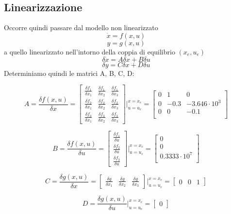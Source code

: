 \documentclass{article}
\begin{document}
\subsection{Linearizzazione}
Occorre quindi passare dal modello non linearizzato
\[
\Dot{x}=f(x,u)
\]
\[
y=g(x,u)
\]
\noindent
a quello linearizzato nell'intorno della coppia di equilibrio $(x_e,u_e)$
\[
\delta\Dot{x}=A\delta{x}+B\delta{u}
\]
\[
\delta{y}=C\delta{x}+D\delta{u}
\]
\noindent
Determiniamo quindi le matrici A, B, C, D:
\begin{large}
\[
A=\frac{ \delta{f(x,u)}}{\delta{x}}=
\begin{bmatrix}\frac{\delta{f_1}}{\delta{x_1}} & \frac{\delta{f_1}}{\delta{x_2}}    
& \frac{\delta{f_1}}{\delta{x_3}}\\ 
\frac{\delta{f_2}}{\delta{x_1}} & \frac{\delta{f_2}}{\delta{x_2}}& \frac{\delta{f_2}}{\delta{x_3}} \\
\frac{\delta{f_3}}{\delta{x_1}} & \frac{\delta{f_3}}{\delta{x_2}}& \frac{\delta{f_3}}{\delta{x_3}}
\end{bmatrix}|_{u=u_e}^{x=x_e} = 
\begin{bmatrix}0&1&0\\0&-0.3&-3.646\cdot{10}^3\\0&0&-0.1\\\end{bmatrix}
\]

\[
B=\frac{ \delta{f(x,u)}}{\delta{u}}=
\begin{bmatrix}\frac{\delta{f_1}}{\delta{u}}\\ \frac{\delta{f_2}}{\delta{u}}\\ \frac{\delta{f_3}}{\delta{u}}\end{bmatrix}|_{u=u_e}^{x=x_e}=
\begin{bmatrix}0\\0\\0.3333\cdot10^7\\\end{bmatrix}
\]

\[
C=\frac{ \delta{g(x,u)}}{\delta{x}}=
\begin{bmatrix}\frac{\delta{g}}{\delta{x_1}} & \frac{\delta{g}}{\delta{x_2}}& \frac{\delta{g}}{\delta{x_3}}\end{bmatrix}|_{u=u_e}^{x=x_e}=
\begin{bmatrix}0 & 0 & 1\end{bmatrix}
\]

\[
D=\frac{ \delta{g(x,u)}}{\delta{u}}|_{u=u_e}^{x=x_e}=
\begin{bmatrix}0\end{bmatrix}
\]
\end{large}
\end{document}
